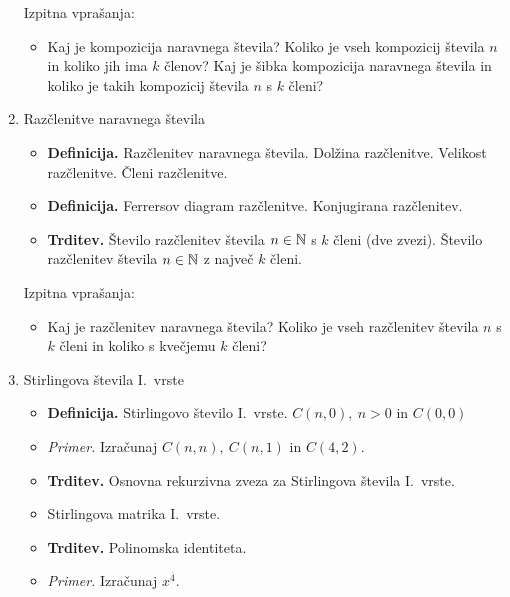 \begin{enumerate}
    Izpitna vprašanja:
    \begin{itemize}
        \item Kaj je kompozicija naravnega števila? Koliko je vseh kompozicij števila \(n\) in koliko jih ima \(k\) členov? Kaj je šibka kompozicija naravnega števila in koliko je takih kompozicij števila \(n\) s \(k\) členi?
    \end{itemize}

    \item Razčlenitve naravnega števila
    \begin{itemize}
        \item \colorbox{purple!30}{\textbf{Definicija.}} Razčlenitev naravnega števila. Dolžina razčlenitve. Velikost razčlenitve. Členi razčlenitve.
        \item \colorbox{purple!30}{\textbf{Definicija.}} Ferrersov diagram razčlenitve. Konjugirana razčlenitev.
        \item \colorbox{blue!30}{\textbf{Trditev.}} Število razčlenitev števila \(n \in \mathbb{N}\) s \(k\) členi (dve zvezi). Število razčlenitev števila \(n \in \mathbb{N}\) z največ \(k\) členi. 
    \end{itemize}

    Izpitna vprašanja:
    \begin{itemize}
        \item Kaj je razčlenitev naravnega števila? Koliko je vseh razčlenitev števila \(n\) s \(k\) členi in koliko s kvečjemu \(k\) členi?
    \end{itemize}

    \item Stirlingova števila I.\ vrste
    \begin{itemize}
        \item \colorbox{purple!30}{\textbf{Definicija.}} Stirlingovo število I.\ vrste. \(C(n,0), \ n > 0\) in \(C(0,0)\)
        \item \colorbox{yellow!30}{\emph{Primer.}} Izračunaj \(C(n,n), \ C(n, 1)\) in \(C(4, 2)\). 
        \item \colorbox{blue!30}{\textbf{Trditev.}} Osnovna rekurzivna zveza za Stirlingova števila I.\ vrste.
        \item Stirlingova matrika I.\ vrste.
        \item \colorbox{blue!30}{\textbf{Trditev.}} Polinomska identiteta.
        \item \colorbox{yellow!30}{\emph{Primer.}} Izračunaj \(x^{\overline{4}}\).
    \end{itemize}


\end{enumerate}
